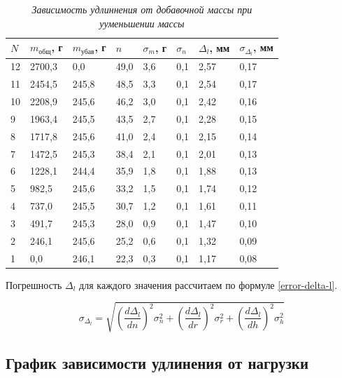 \documentclass[a4paper,12pt]{article}
\begin{document}
\begin{table}[!ht]
    \centering
    \begin{tabular}{|l|l|l|l|l|l|l|l|}
    \hline
        $N$ & $m_\text{общ}$, г & $m_\text{убав}$, г & $n$ & $\sigma_m$, г & $\sigma_n$ & $\Delta_l$, мм & $\sigma_{\Delta_l}$, мм \\ \hline
        12 & 2700,3 & 0,0 & 49,0 & 3,6 & 0,1 & 2,57 & 0,17 \\ \hline
        11 & 2454,5 & 245,8 & 48,5 & 3,3 & 0,1 & 2,54 & 0,17 \\ \hline
        10 & 2208,9 & 245,6 & 46,2 & 3,0 & 0,1 & 2,42 & 0,16 \\ \hline
        9 & 1963,4 & 245,5 & 43,5 & 2,7 & 0,1 & 2,28 & 0,15 \\ \hline
        8 & 1717,8 & 245,6 & 41,0 & 2,4 & 0,1 & 2,15 & 0,14 \\ \hline
        7 & 1472,5 & 245,3 & 38,4 & 2,1 & 0,1 & 2,01 & 0,13 \\ \hline
        6 & 1228,1 & 244,4 & 35,9 & 1,8 & 0,1 & 1,88 & 0,13 \\ \hline
        5 & 982,5 & 245,6 & 33,2 & 1,5 & 0,1 & 1,74 & 0,12 \\ \hline
        4 & 737,0 & 245,5 & 30,7 & 1,2 & 0,1 & 1,61 & 0,11 \\ \hline
        3 & 491,7 & 245,3 & 28,0 & 0,9 & 0,1 & 1,47 & 0,10 \\ \hline
        2 & 246,1 & 245,6 & 25,2 & 0,6 & 0,1 & 1,32 & 0,09 \\ \hline
        1 & 0,0 & 246,1 & 22,3 & 0,3 & 0,1 & 1,17 & 0,08 \\ \hline
    \end{tabular}\caption{\textit{Зависимость удлиннения от добавочной массы при ууменьшении массы}}\label{udlin-umen}
\end{table}

Погрешность $\Delta_l$ для каждого значения рассчитаем по формуле \eqref{error-delta-l}.

\begin{equation}\label{error-delta-l}
    \sigma_{\Delta_l} = \sqrt{
    \left( \frac{d \Delta_l}{dn} \right) ^ 2 \sigma_{n}^2 + 
    \left( \frac{d \Delta_l}{dr} \right) ^ 2 \sigma_{r}^2 + 
    \left( \frac{d \Delta_l}{dh} \right) ^ 2 \sigma_{h}^2
    }
\end{equation}

\subsection{График зависимости удлинения от нагрузки}
\end{document}
